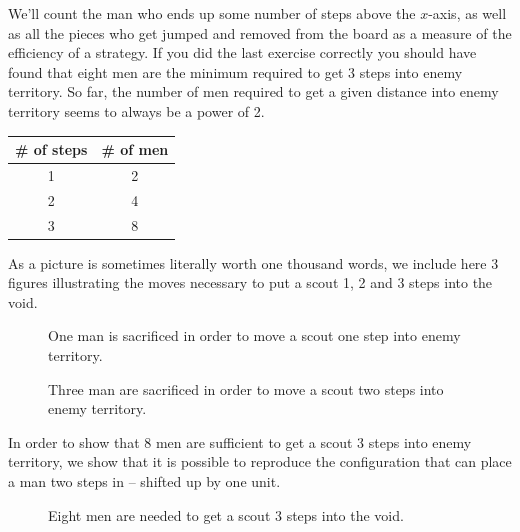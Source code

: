 We'll count the man who ends up some number of steps above the
$x$-axis, as well as all the pieces who get jumped and removed
from the board as a measure of the efficiency of a strategy.
If you did the last exercise correctly you should have found that 
eight men are the minimum required to get 3 steps into enemy 
territory.  So far, the number of men required to get a given
distance into enemy territory seems to always be a power of 
2.

\begin{center}
\begin{tabular}{c|c}
\# of steps & \# of men \\ \hline
1 & 2 \\
2 & 4 \\
3 & 8 \\
\end{tabular}
\end{center}  

As a picture is sometimes literally worth one thousand words, we
include here 3 figures illustrating the moves necessary to put 
a scout 1, 2 and 3 steps into the void.

\begin{figure}[!hbtp] 
\begin{center}

\end{center}
\caption[Moving one step into the void is trivial.]{One man is sacrificed in 
order to move a scout one step into enemy territory.}
\label{fig:one_step}
\end{figure}

\begin{figure}[!hbtp] 
\begin{center}

\end{center}
\caption[Moving two steps into the void is more difficult.]{Three man are sacrificed in 
order to move a scout two steps into enemy territory.}
\label{fig:two_steps}
\end{figure}

In order to show that 8 men are sufficient to get a scout 3 steps into
enemy territory, we show that it is possible to reproduce the configuration
that can place a man two steps in -- shifted up by one unit.

\begin{figure}[!hbtp] 
\hspace{-.2in}
\caption[Moving three steps into the void takes 8 men.]{Eight men are needed to
get a scout 3 steps into the void.}
\label{fig:three_steps}
\end{figure}


